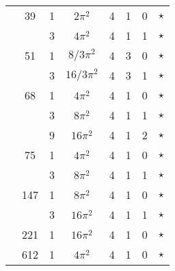 \documentclass[12pt]{amsart}
\providecommand{\DIFadd}[1]{{\protect\color{blue}\uwave{#1}}} %
\providecommand{\DIFdel}[1]{{\protect\color{red}\sout{#1}}}                      %
\providecommand{\DIFaddbegin}{} %
\providecommand{\DIFaddend}{} %
\providecommand{\DIFdelbegin}{} %
\providecommand{\DIFdelend}{} %
\begin{document}
\begin{tabular}{ccc|ccccc}
 & 39 & 1 & $2\pi^2$ & 4 & 1 & 0 & $\star$ \\
 &  & 3 & $4\pi^2$ & 4 & 1 & 1 & $\star$ \\
 & 51 & 1 & \DIFdelbegin \DIFdel{$8/3\pi^2$ }\DIFdelend \DIFaddbegin \DIFadd{$(8/3)\pi^2$ }\DIFaddend & 4 & 3 & 0 & $\star$ \\
 &  & 3 & \DIFdelbegin \DIFdel{$16/3\pi^2$ }\DIFdelend \DIFaddbegin \DIFadd{$(16/3)\pi^2$ }\DIFaddend & 4 & 3 & 1 & $\star$ \\
 & 68 & 1 & $4\pi^2$ & 4 & 1 & 0 & $\star$ \\
 &  & 3 & $8\pi^2$ & 4 & 1 & 1 & $\star$ \\
 &  & 9 & $16\pi^2$ & 4 & 1 & 2 & $\star$ \\
 & 75 & 1 & $4\pi^2$ & 4 & 1 & 0 & $\star$ \\
 &  & 3 & $8\pi^2$ & 4 & 1 & 1 & $\star$ \\
 & 147 & 1 & $8\pi^2$ & 4 & 1 & 0 & $\star$ \\
 &  & 3 & $16\pi^2$ & 4 & 1 & 1 & $\star$ \\
 & 221 & 1 & $16\pi^2$ & 4 & 1 & 0 & $\star$ \\
 & 612 & 1 & $4\pi^2$ & 4 & 1 & 0 & $\star$ 
\end{tabular}
\end{document}
